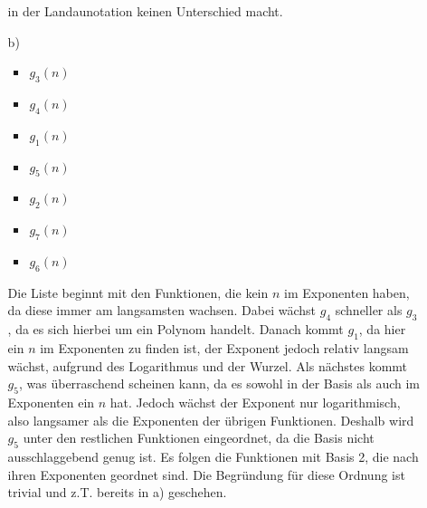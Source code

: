 \documentclass[a4paper,11pt]{article}
\begin{document}
\begin{enumerate}
\begin{enumerate}
                        in der Landaunotation keinen Unterschied macht.
                    \item[b)]
                        \begin{itemize}
                            \item $g_3(n)$\\
                            \item $g_4(n)$\\
                            \item $g_1(n)$\\
                            \item $g_5(n)$\\
                            \item $g_2(n)$\\
                            \item $g_7(n)$\\
                            \item $g_6(n)$\\
                        \end{itemize}
                        Die Liste beginnt mit den Funktionen, die kein
                        $n$ im Exponenten haben, da diese immer am langsamsten
                        wachsen. Dabei wächst $g_4$ schneller als $g_3$, da
                        es sich hierbei um ein Polynom handelt. Danach kommt
                        $g_1$, da hier ein $n$ im Exponenten zu finden ist,
                        der Exponent jedoch relativ langsam wächst, aufgrund
                        des Logarithmus und der Wurzel. Als nächstes kommt 
                        $g_5$, was überraschend scheinen kann, da es sowohl
                        in der Basis als auch im Exponenten ein $n$ hat. Jedoch
                        wächst der Exponent nur logarithmisch, also langsamer
                        als die Exponenten der übrigen Funktionen. Deshalb 
                        wird $g_5$ unter den restlichen Funktionen eingeordnet,
                        da die Basis nicht ausschlaggebend genug ist.
                        Es folgen die Funktionen mit Basis 2, die nach 
                        ihren Exponenten geordnet sind. Die Begründung für diese
                        Ordnung ist trivial und z.T. bereits in a) geschehen.
                \end{enumerate}


\end{enumerate}
\end{document}

